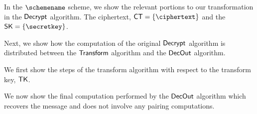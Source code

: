 \documentclass[11pt]{article}
\begin{document}
In the ${\schemename}$ scheme, we show the relevant portions to our transformation in the $\mathsf{Decrypt}$ algorithm. The ciphertext, $\CT = \{\ciphertext\}$ and the \\ $\SK = \{\secretkey\}$. 

\gutsofdecrypt

 Next, we show how the computation of the original $\mathsf{Decrypt}$ algorithm is distributed between the $\mathsf{Transform}$ algorithm and the $\mathsf{DecOut}$ algorithm.

\medskip \noindent
We first show the steps of the transform algorithm with respect to the transform key, $\mathsf{TK}$. 

\gutsoftransform

\noindent
We now show the final computation performed by the $\mathsf{DecOut}$ algorithm which recovers the message and does not involve any pairing computations.

\gutsofdecout
\end{document}
